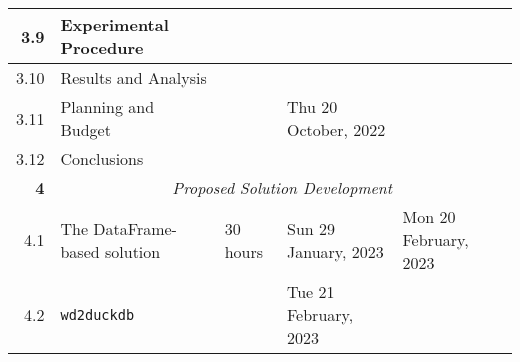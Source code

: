 \documentclass{standalone}
\begin{document}
\begin{tabular}{|r|llll|}
    3.9                                                           & \multicolumn{1}{l|}{Experimental Procedure}                     & \multicolumn{1}{l|}{}                                          & \multicolumn{1}{l|}{}                                       &                                                              \\ \hline
    3.10                                                          & \multicolumn{1}{l|}{Results and Analysis}                       & \multicolumn{1}{l|}{}                                          & \multicolumn{1}{l|}{}                                       &                                                              \\ \hline
    3.11                                                          & \multicolumn{1}{l|}{Planning and Budget}                        & \multicolumn{1}{l|}{}                                          & \multicolumn{1}{l|}{Thu 20 October, 2022}                   &                                                              \\ \hline
    3.12                                                          & \multicolumn{1}{l|}{Conclusions}                                & \multicolumn{1}{l|}{}                                          & \multicolumn{1}{l|}{}                                       &                                                              \\ \hline
    \textbf{4}                                                    & \multicolumn{4}{c|}{\textit{Proposed Solution Development}}                                                                                                                                                                                                   \\ \hline
    4.1                                                           & \multicolumn{1}{l|}{The DataFrame-based solution}               & \multicolumn{1}{l|}{30 hours}                                  & \multicolumn{1}{l|}{Sun 29 January, 2023}                   & Mon 20 February, 2023                                        \\ \hline
    4.2                                                           & \multicolumn{1}{l|}{\texttt{wd2duckdb}}                         & \multicolumn{1}{l|}{}                                          & \multicolumn{1}{l|}{Tue 21 February, 2023}                  &                                                              \\ \hline

\end{tabular}
\end{document}
